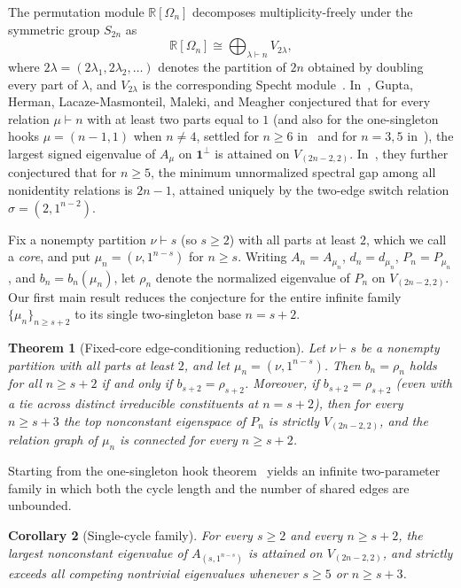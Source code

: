 \documentclass[11pt]{article}
\newtheorem{theorem}{Theorem}
\newtheorem{corollary}[theorem]{Corollary}
\theoremstyle{remark}
\newcommand{\R}{\mathbb{R}}
\newcommand{\one}{\mathbf{1}}
\begin{document}
The permutation module $\R[\Omega_n]$ decomposes multiplicity-freely under the
symmetric group $S_{2n}$ as
\[
  \R[\Omega_n] \cong \bigoplus_{\lambda \vdash n} V_{2\lambda},
\]
where $2\lambda = (2\lambda_1, 2\lambda_2, \dots)$ denotes the partition of
$2n$ obtained by doubling every part of $\lambda$, and $V_{2\lambda}$ is the
corresponding Specht module~\cite{Srinivasan}. In~\cite[Conjecture~1.3]{GuptaEtAl},
Gupta, Herman, Lacaze-Masmonteil, Maleki, and Meagher conjectured that for
every relation $\mu \vdash n$ with at least two parts equal to $1$ (and also
for the one-singleton hooks $\mu = (n-1, 1)$ when $n \neq 4$, settled for
$n \ge 6$ in~\cite[Corollary~3.5]{GuptaEtAl} and for $n=3,5$
in~\cite[Appendix~A]{GuptaEtAl}), the largest signed eigenvalue of $A_\mu$ on
$\one^\perp$ is attained on $V_{(2n-2,2)}$. In~\cite[Conjecture~6.1]{GuptaEtAl},
they further conjectured that for $n \ge 5$, the minimum unnormalized spectral
gap among all nonidentity relations is $2n-1$, attained uniquely by the
two-edge switch relation $\sigma = (2, 1^{n-2})$.

Fix a nonempty partition $\nu \vdash s$ (so $s \ge 2$) with all parts at least
$2$, which we call a \emph{core}, and put $\mu_n = (\nu, 1^{n-s})$ for
$n \ge s$. Writing $A_n = A_{\mu_n}$, $d_n = d_{\mu_n}$, $P_n = P_{\mu_n}$, and
$b_n = b_n(\mu_n)$, let $\rho_n$ denote the normalized eigenvalue of $P_n$ on
$V_{(2n-2,2)}$. Our first main result reduces the conjecture for the entire
infinite family $\{\mu_n\}_{n \ge s+2}$ to its single two-singleton base
$n = s+2$.

\begin{theorem}[Fixed-core edge-conditioning reduction]\label{thm:reduction}
Let $\nu \vdash s$ be a nonempty partition with all parts at least $2$, and let
$\mu_n = (\nu, 1^{n-s})$. Then $b_n = \rho_n$ holds for all $n \ge s+2$ if and
only if $b_{s+2} = \rho_{s+2}$. Moreover, if $b_{s+2} = \rho_{s+2}$ (even with
a tie across distinct irreducible constituents at $n = s+2$), then for every
$n \ge s+3$ the top nonconstant eigenspace of $P_n$ is strictly $V_{(2n-2,2)}$,
and the relation graph of $\mu_n$ is connected for every $n \ge s+2$.
\end{theorem}

Starting from the one-singleton hook theorem~\cite[Corollary~3.5]{GuptaEtAl}
yields an infinite two-parameter family in which both the cycle length and the
number of shared edges are unbounded.

\begin{corollary}[Single-cycle family]\label{cor:single-cycle}
For every $s \ge 2$ and every $n \ge s+2$, the largest nonconstant eigenvalue
of $A_{(s, 1^{n-s})}$ is attained on $V_{(2n-2,2)}$, and strictly exceeds all
competing nontrivial eigenvalues whenever $s \ge 5$ or $n \ge s+3$.
\end{corollary}
\end{document}
